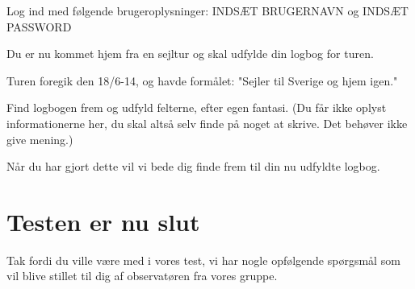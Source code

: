 Log ind med følgende brugeroplysninger: INDSÆT BRUGERNAVN og INDSÆT PASSWORD

Du er nu kommet hjem fra en sejltur og skal udfylde din logbog for turen.

Turen foregik den 18/6-14, og havde formålet: "Sejler til Sverige og hjem igen."

Find logbogen frem og udfyld felterne, efter egen fantasi. (Du får ikke oplyst informationerne her, du skal altså selv finde på noget at skrive. Det behøver ikke give mening.)

Når du har gjort dette vil vi bede dig finde frem til din nu udfyldte logbog. 

\section{Testen er nu slut}


Tak fordi du ville være med i vores test, vi har nogle opfølgende spørgsmål som vil blive stillet til dig af observatøren fra vores gruppe.

